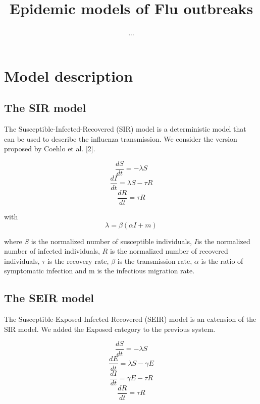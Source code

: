 \documentclass[11pt, a4paper]{article}
\author{...}
\title{Epidemic models of Flu outbreaks}
\begin{document}
\maketitle

\section{Model description}
\subsection{The SIR model}
The Susceptible-Infected-Recovered (SIR) model is a deterministic model that can be used to describe the influenza transmission. We consider the version proposed by Coehlo et al. [2].

\begin{equation}
\frac{dS}{dt} = - \lambda S
\end{equation}
\begin{equation}
\frac{dI}{dt} = \lambda S - \tau R
\end{equation}
\begin{equation}
\frac{dR}{dt} = \tau R
\end{equation}

with \[ \lambda = \beta (\alpha I + m) \]

where $S$ is the normalized number of susceptible individuals, $I$is the normalized number of infected individuals, $R$ is the normalized number of recovered individuals, $\tau $ is the recovery rate, $\beta $ is the transmission rate, $\alpha$ is the ratio of symptomatic infection and m is the infectious migration rate.

\subsection{The SEIR model}
The Susceptible-Exposed-Infected-Recovered (SEIR) model is an extension of the SIR model. We added the Exposed category to the previous system.

\begin{equation}
\frac{dS}{dt} = - \lambda S
\end{equation}
\begin{equation}
\frac{dE}{dt} = \lambda S - \gamma E
\end{equation}
\begin{equation}
\frac{dI}{dt} = \gamma E - \tau R
\end{equation}
\begin{equation}
\frac{dR}{dt} = \tau R
\end{equation}
\end{document}

